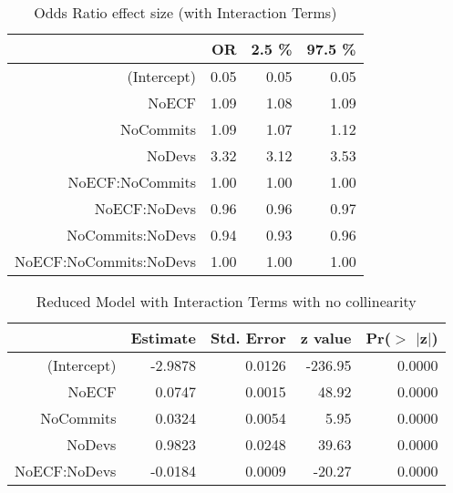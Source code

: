 \documentclass[times]{smrauth}
\begin{document}
\begin{table}[tbp]
\centering
\caption{Odds Ratio effect size (with Interaction Terms)} 
\label{tab:oddsratiowithinteractionterms}
\begin{tabular}{rrrr}
  \hline
 & OR & 2.5 \% & 97.5 \% \\ 
  \hline
(Intercept) & 0.05 & 0.05 & 0.05 \\ 
  NoECF & 1.09 & 1.08 & 1.09 \\ 
  NoCommits & 1.09 & 1.07 & 1.12 \\ 
  NoDevs & 3.32 & 3.12 & 3.53 \\ 
  NoECF:NoCommits & 1.00 & 1.00 & 1.00 \\ 
  NoECF:NoDevs & 0.96 & 0.96 & 0.97 \\ 
  NoCommits:NoDevs & 0.94 & 0.93 & 0.96 \\ 
  NoECF:NoCommits:NoDevs & 1.00 & 1.00 & 1.00 \\ 
   \hline
\end{tabular}
\end{table}






\begin{table}[tbp]
\centering
\caption{Reduced Model with Interaction Terms with no collinearity} 
\label{tBest}
\begin{tabular}{rrrrr}
  \hline
 & Estimate & Std. Error & z value & Pr($>$ $|$z$|$) \\ 
  \hline
(Intercept) & -2.9878 & 0.0126 & -236.95 & 0.0000 \\ 
  NoECF & 0.0747 & 0.0015 & 48.92 & 0.0000 \\ 
  NoCommits & 0.0324 & 0.0054 & 5.95 & 0.0000 \\ 
  NoDevs & 0.9823 & 0.0248 & 39.63 & 0.0000 \\ 
  NoECF:NoDevs & -0.0184 & 0.0009 & -20.27 & 0.0000 \\ 
   \hline
\end{tabular}
\end{table}%
\end{document}
